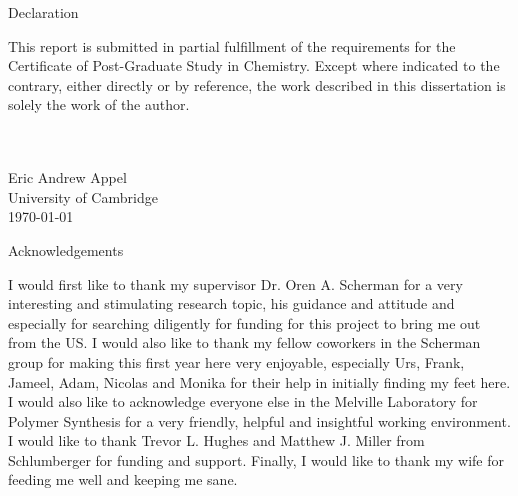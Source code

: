 \documentclass[a4wide,12pt]{report} %
\begin{document}



\doublespacing


\begin{center}
\Large{Declaration}
\end{center}
\noindent
This report is submitted in partial fulfillment of the requirements for the Certificate of Post-Graduate Study in Chemistry. Except where indicated to the contrary, either directly or by reference, the work described in this dissertation is solely the work of the author. 
\\
\\ 
\\
\begin{flushright}
Eric Andrew Appel\\
University of Cambridge\\
\today
\end{flushright}


\newpage
\begin{center}
\Large{Acknowledgements}
\end{center}
\noindent
I would first like to thank my supervisor Dr. Oren A. Scherman for a very interesting and stimulating research topic, his guidance and attitude and especially for searching diligently for funding for this project to bring me out from the US. I would also like to thank my fellow coworkers in the Scherman group for making this first year here very enjoyable, especially Urs, Frank, Jameel, Adam, Nicolas and Monika for their help in initially finding my feet here. I would also like to acknowledge everyone else in the Melville Laboratory for Polymer Synthesis for a very friendly, helpful and insightful working environment. I would like to thank Trevor L. Hughes and Matthew J. Miller from Schlumberger for funding and support. Finally, I would like to thank my wife for feeding me well and keeping me sane.
\end{document}
